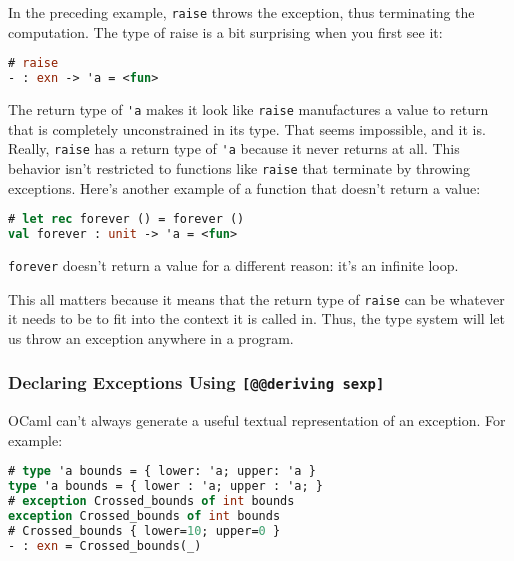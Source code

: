 In the preceding example, \passthrough{\lstinline!raise!} throws the
exception, thus terminating the computation. The type of raise is a bit
surprising when you first see it:

\begin{lstlisting}[language=Caml]
# raise
- : exn -> 'a = <fun>
\end{lstlisting}

The return type of \passthrough{\lstinline!'a!} makes it look like
\passthrough{\lstinline!raise!} manufactures a value to return that is
completely unconstrained in its type. That seems impossible, and it is.
Really, \passthrough{\lstinline!raise!} has a return type of
\passthrough{\lstinline!'a!} because it never returns at all. This
behavior isn't restricted to functions like
\passthrough{\lstinline!raise!} that terminate by throwing exceptions.
Here's another example of a function that doesn't return a value:

\begin{lstlisting}[language=Caml]
# let rec forever () = forever ()
val forever : unit -> 'a = <fun>
\end{lstlisting}

\passthrough{\lstinline!forever!} doesn't return a value for a different
reason: it's an infinite loop.

This all matters because it means that the return type of
\passthrough{\lstinline!raise!} can be whatever it needs to be to fit
into the context it is called in. Thus, the type system will let us
throw an exception anywhere in a program. 

\hypertarget{declaring-exceptions-using-deriving-sexp}{%
\subsubsection{\texorpdfstring{Declaring Exceptions Using
\texttt{{[}@@deriving\ sexp{]}}}{Declaring Exceptions Using {[}@@deriving sexp{]}}}\label{declaring-exceptions-using-deriving-sexp}}

OCaml can't always generate a useful textual representation of an
exception. For example:

\begin{lstlisting}[language=Caml]
# type 'a bounds = { lower: 'a; upper: 'a }
type 'a bounds = { lower : 'a; upper : 'a; }
# exception Crossed_bounds of int bounds
exception Crossed_bounds of int bounds
# Crossed_bounds { lower=10; upper=0 }
- : exn = Crossed_bounds(_)
\end{lstlisting}

